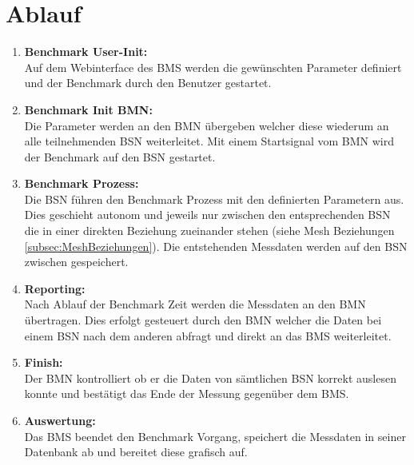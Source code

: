 	\clearpage
\section{Ablauf}\label{sec:Ablauf}


\begin{enumerate}
	\item \textbf{Benchmark User-Init:}\\
	Auf dem Webinterface des BMS werden die gewünschten Parameter definiert und der Benchmark durch den Benutzer gestartet.
	\item \textbf{Benchmark Init BMN:}\\
	Die Parameter werden an den BMN übergeben welcher diese wiederum an alle teilnehmenden BSN weiterleitet. Mit einem Startsignal vom BMN wird der Benchmark auf den BSN gestartet.
	\item \textbf{Benchmark Prozess:}\\
	Die BSN führen den Benchmark Prozess mit den definierten Parametern aus. Dies geschieht autonom und jeweils nur zwischen den entsprechenden BSN die in einer direkten Beziehung zueinander stehen (siehe Mesh Beziehungen \ref{subsec:MeshBeziehungen}). Die entstehenden Messdaten werden auf den BSN zwischen gespeichert.
	\item \textbf{Reporting:}\\
	Nach Ablauf der Benchmark Zeit werden die Messdaten an den BMN übertragen. Dies erfolgt gesteuert durch den BMN welcher die Daten bei einem BSN nach dem anderen abfragt und direkt an das BMS weiterleitet.
	\item \textbf{Finish:}\\
	Der BMN kontrolliert ob er die Daten von sämtlichen BSN korrekt auslesen konnte und bestätigt das Ende der Messung gegenüber dem BMS.
	\item \textbf{Auswertung:}\\
	Das BMS beendet den Benchmark Vorgang, speichert die Messdaten in seiner Datenbank ab und bereitet diese grafisch auf. 
\end{enumerate}




%




